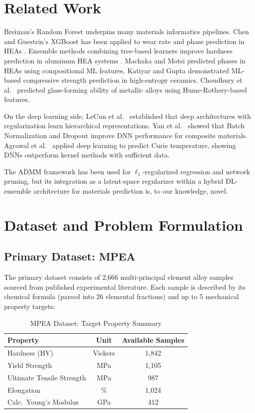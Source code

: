 \documentclass[conference]{IEEEtran}
\begin{document}
\section{Related Work}

Breiman's Random Forest \cite{b13} underpins many materials informatics pipelines. Chen and Guestrin's XGBoost \cite{b15} has been applied to wear rate and phase prediction in HEAs \cite{b21}. Ensemble methods combining tree-based learners improve hardness prediction in aluminum HEA systems \cite{b18}. Machaka and Motsi \cite{b22} predicted phases in HEAs using compositional ML features. Katiyar and Gupta \cite{b23} demonstrated ML-based compressive strength prediction in high-entropy ceramics. Choudhury et al.\ \cite{b20} predicted glass-forming ability of metallic alloys using Hume-Rothery-based features.

On the deep learning side, LeCun et al.\ \cite{b10} established that deep architectures with regularization learn hierarchical representations. Yan et al.\ \cite{b9} showed that Batch Normalization and Dropout improve DNN performance for composite materials. Agrawal et al.\ \cite{b19} applied deep learning to predict Curie temperature, showing DNNs outperform kernel methods with sufficient data.

The ADMM framework \cite{b2} has been used for $\ell_1$-regularized regression and network pruning, but its integration as a latent-space regularizer within a hybrid DL-ensemble architecture for materials prediction is, to our knowledge, novel.

\section{Dataset and Problem Formulation}

\subsection{Primary Dataset: MPEA}
The primary dataset consists of 2,666 multi-principal element alloy samples sourced from published experimental literature. Each sample is described by its chemical formula (parsed into 26 elemental fractions) and up to 5 mechanical property targets:

\begin{table}[htbp]
\caption{MPEA Dataset: Target Property Summary}
\label{tab:dataset}
\centering
\renewcommand{\arraystretch}{1.15}
\begin{tabular}{@{}lcc@{}}
\toprule
\textbf{Property} & \textbf{Unit} & \textbf{Available Samples} \\
\midrule
Hardness (HV) & Vickers & 1,842 \\
Yield Strength & MPa & 1,105 \\
Ultimate Tensile Strength & MPa & 987 \\
Elongation & \% & 1,024 \\
Calc.\ Young's Modulus & GPa & 412 \\
\bottomrule
\end{tabular}
\end{table}
\end{document}
